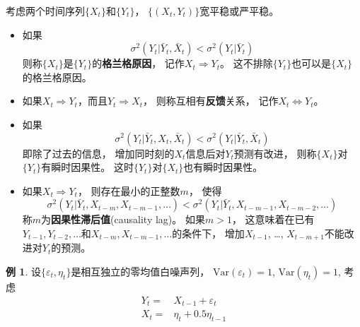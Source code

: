\documentclass[
  oneside]{book}
\providecommand{\tightlist}{%
  \setlength{\itemsep}{0pt}\setlength{\parskip}{0pt}}
\theoremstyle{definition}
\theoremstyle{definition}
\newtheorem{example}{例}[chapter]
\theoremstyle{definition}
\theoremstyle{definition}
\theoremstyle{remark}
\begin{document}
考虑两个时间序列\(\{ X_t \}\)和\(\{ Y_t \}\)，
\(\{(X_t, Y_t) \}\)宽平稳或严平稳。

\begin{itemize}
\tightlist
\item
  如果
  \[
  \sigma^2(Y_t | \bar Y_t, \bar X_t) < \sigma^2(Y_t | \bar Y_t)
  \]
  则称\(\{ X_t \}\)是\(\{ Y_t \}\)的\textbf{格兰格原因}，
  记作\(X_t \Rightarrow Y_t\)。
  这不排除\(\{ Y_t \}\)也可以是\(\{ X_t \}\)的格兰格原因。
\item
  如果\(X_t \Rightarrow Y_t\)，而且\(Y_t \Rightarrow X_t\)，
  则称互相有\textbf{反馈}关系，
  记作\(X_t \Leftrightarrow Y_t\)。
\item
  如果
  \[
  \sigma^2(Y_t | \bar Y_t, X_t, \bar X_t) < \sigma^2(Y_t | \bar Y_t, \bar X_t)
  \]
  即除了过去的信息，
  增加同时刻的\(X_t\)信息后对\(Y_t\)预测有改进，
  则称\(\{X_t \}\)对\(\{Y_t \}\)有瞬时因果性。
  这时\(\{Y_t \}\)对\(\{X_t \}\)也有瞬时因果性。
\item
  如果\(X_t \Rightarrow Y_t\)，
  则存在最小的正整数\(m\)，
  使得
  \[
  \sigma^2(Y_t | \bar Y_t, X_{t-m}, X_{t-m-1}, \dots) 
  < \sigma^2(Y_t | \bar Y_t, X_{t-m-1}, X_{t-m-2}, \dots) 
  \]
  称\(m\)为\textbf{因果性滞后值}(causality lag)。
  如果\(m>1\)，
  这意味着在已有\(Y_{t-1}, Y_{t-2}, \dots\)和\(X_{t-m}, X_{t-m-1}, \dots\)的条件下，
  增加\(X_{t-1}\), \dots, \(X_{t-m+1}\)不能改进对\(Y_t\)的预测。
\end{itemize}

\begin{example}
\protect\hypertarget{exm:causal-exaxylag1}{}\label{exm:causal-exaxylag1}设\(\{ \varepsilon_t, \eta_t \}\)是相互独立的零均值白噪声列，
\(\text{Var}(\varepsilon_t)=1\),
\(\text{Var}(\eta_t)=1\),
考虑
\[\begin{aligned}
Y_t =& X_{t-1} + \varepsilon_t \\
X_t =& \eta_t + 0.5 \eta_{t-1}
\end{aligned}\]
\end{example}
\end{document}
